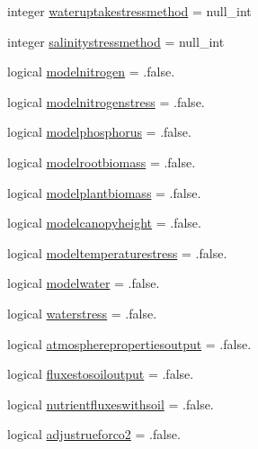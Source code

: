 \begin{DoxyCompactItemize}
integer \mbox{\hyperlink{structmodulevegetation_1_1t__computeoptions_a4a7ab296a53a3049da20d34600af370c}{wateruptakestressmethod}} = null\+\_\+int
\item 
integer \mbox{\hyperlink{structmodulevegetation_1_1t__computeoptions_af7d2ed9e29bc4e9826f502385b86b77d}{salinitystressmethod}} = null\+\_\+int
\item 
logical \mbox{\hyperlink{structmodulevegetation_1_1t__computeoptions_a33b0fb96769d0dc5f13c1081c95e1429}{modelnitrogen}} = .false.
\item 
logical \mbox{\hyperlink{structmodulevegetation_1_1t__computeoptions_a8e1c4fd3bed11b0dced8a5db2e462269}{modelnitrogenstress}} = .false.
\item 
logical \mbox{\hyperlink{structmodulevegetation_1_1t__computeoptions_a6274e42ec11b976f3a6ce71dac8ced93}{modelphosphorus}} = .false.
\item 
logical \mbox{\hyperlink{structmodulevegetation_1_1t__computeoptions_ad8df226d6a2e0defa1966271f5c7a866}{modelrootbiomass}} = .false.
\item 
logical \mbox{\hyperlink{structmodulevegetation_1_1t__computeoptions_a37434e729d045d16b8f49a75665298a8}{modelplantbiomass}} = .false.
\item 
logical \mbox{\hyperlink{structmodulevegetation_1_1t__computeoptions_a69fb78c51cca6f5ca0aa18fc0cb5455f}{modelcanopyheight}} = .false.
\item 
logical \mbox{\hyperlink{structmodulevegetation_1_1t__computeoptions_a1abe4faf7607e7bdfc59e78930fe15fc}{modeltemperaturestress}} = .false.
\item 
logical \mbox{\hyperlink{structmodulevegetation_1_1t__computeoptions_adc6b55db4547e506f0ce4bce2bf15e7b}{modelwater}} = .false.
\item 
logical \mbox{\hyperlink{structmodulevegetation_1_1t__computeoptions_a652b4715aace1d510586d1d2926dd418}{waterstress}} = .false.
\item 
logical \mbox{\hyperlink{structmodulevegetation_1_1t__computeoptions_a016a1f6c81a799b3c0d459c18e5d52b2}{atmospherepropertiesoutput}} = .false.
\item 
logical \mbox{\hyperlink{structmodulevegetation_1_1t__computeoptions_a485ac88a221bfd5ca05832cdf700a6e5}{fluxestosoiloutput}} = .false.
\item 
logical \mbox{\hyperlink{structmodulevegetation_1_1t__computeoptions_aa03dba29ac9c70fb6a4b5f0342f89a5f}{nutrientfluxeswithsoil}} = .false.
\item 
logical \mbox{\hyperlink{structmodulevegetation_1_1t__computeoptions_a4e5faaa7bcbecb26ac447755e0bfc5ee}{adjustrueforco2}} = .false.

\end{DoxyCompactItemize}
